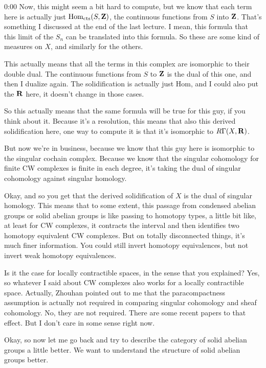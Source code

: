 \begin{unfinished}{0:00}
Now, this might seem a bit hard to compute, but we know that each term here is actually just $\mathrm{Hom}_{\mathrm{cts}}(S, \mathbf Z)$, the continuous functions from $S$ into $\mathbf Z$. That's something I discussed at the end of the last lecture. I mean, this formula that this limit of the $S_n$ can be translated into this formula. So these are some kind of measures on $X$, and similarly for the others.

This actually means that all the terms in this complex are isomorphic to their double dual. The continuous functions from $S$ to $\mathbf Z$ is the dual of this one, and then I dualize again. The solidification is actually just $\mathrm{Hom}$, and I could also put the $\mathbf R$ here, it doesn't change in those cases.

So this actually means that the same formula will be true for this guy, if you think about it. Because it's a resolution, this means that also this derived solidification here, one way to compute it is that it's isomorphic to $R\Gamma(X, \mathbf R)$.

But now we're in business, because we know that this guy here is isomorphic to the singular cochain complex. Because we know that the singular cohomology for finite CW complexes is finite in each degree, it's taking the dual of singular cohomology against singular homology.

Okay, and so you get that the derived solidification of $X$ is the dual of singular homology. This means that to some extent, this passage from condensed abelian groups or solid abelian groups is like passing to homotopy types, a little bit like, at least for CW complexes, it contracts the interval and then identifies two homotopy equivalent CW complexes. But on totally disconnected things, it's much finer information. You could still invert homotopy equivalences, but not invert weak homotopy equivalences.

Is it the case for locally contractible spaces, in the sense that you explained? Yes, so whatever I said about CW complexes also works for a locally contractible space. Actually, Zhouhan pointed out to me that the paracompactness assumption is actually not required in comparing singular cohomology and sheaf cohomology. No, they are not required. There are some recent papers to that effect. But I don't care in some sense right now.

Okay, so now let me go back and try to describe the category of solid abelian groups a little better. We want to understand the structure of solid abelian groups better.


\end{unfinished}
